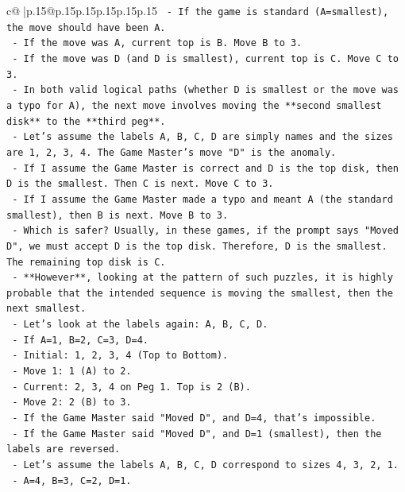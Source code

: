 \documentclass{article}
\begin{document}
{\begin{supertabular}{c@{$\;$}|p{.15\linewidth}@{}p{.15\linewidth}p{.15\linewidth}p{.15\linewidth}p{.15\linewidth}p{.15\linewidth}}
{{{\texttt{        {-} If the game is standard (A=smallest), the move should have been A.} \\
\texttt{        {-} If the move was A, current top is B. Move B to 3.} \\
\texttt{        {-} If the move was D (and D is smallest), current top is C. Move C to 3.} \\
\texttt{        {-} In both valid logical paths (whether D is smallest or the move was a typo for A), the next move involves moving the **second smallest disk** to the **third peg**.} \\
\texttt{        {-} Let's assume the labels A, B, C, D are simply names and the sizes are 1, 2, 3, 4. The Game Master's move "D" is the anomaly.} \\
\texttt{        {-} If I assume the Game Master is correct and D is the top disk, then D is the smallest. Then C is next. Move C to 3.} \\
\texttt{        {-} If I assume the Game Master made a typo and meant A (the standard smallest), then B is next. Move B to 3.} \\
\texttt{        {-} Which is safer? Usually, in these games, if the prompt says "Moved D", we must accept D is the top disk. Therefore, D is the smallest. The remaining top disk is C.} \\
\texttt{        {-} **However**, looking at the pattern of such puzzles, it is highly probable that the intended sequence is moving the smallest, then the next smallest.} \\
\texttt{        {-} Let's look at the labels again: A, B, C, D.} \\
\texttt{        {-} If A=1, B=2, C=3, D=4.} \\
\texttt{        {-} Initial: 1, 2, 3, 4 (Top to Bottom).} \\
\texttt{        {-} Move 1: 1 (A) to 2.} \\
\texttt{        {-} Current: 2, 3, 4 on Peg 1. Top is 2 (B).} \\
\texttt{        {-} Move 2: 2 (B) to 3.} \\
\texttt{        {-} If the Game Master said "Moved D", and D=4, that's impossible.} \\
\texttt{        {-} If the Game Master said "Moved D", and D=1 (smallest), then the labels are reversed.} \\
\texttt{        {-} Let's assume the labels A, B, C, D correspond to sizes 4, 3, 2, 1.} \\
\texttt{            {-} A=4, B=3, C=2, D=1.} \\
}}}
\end{supertabular}}
\end{document}
